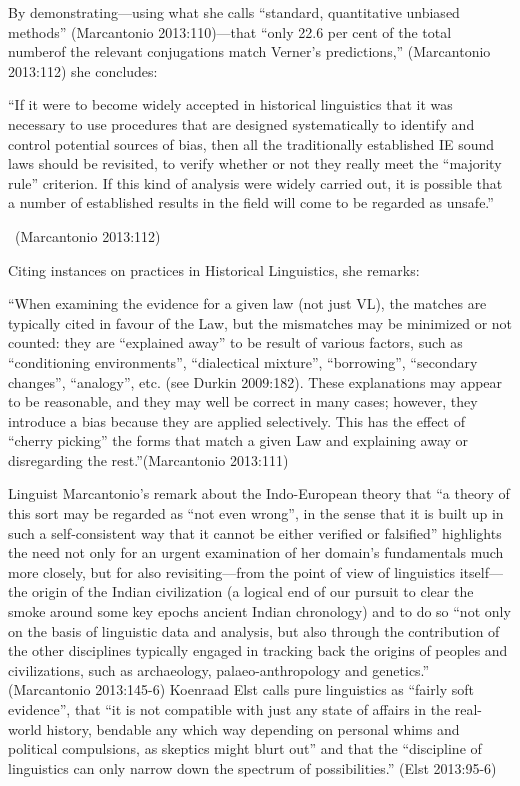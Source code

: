 By demonstrating—using what she calls “standard, quantitative unbiased methods” (Marcantonio 2013:110)—that “only 22.6 per cent of the total numberof the relevant conjugations match Verner’s predictions,” (Marcantonio 2013:112) she concludes:

\begin{myquote}
“If it were to become widely accepted in historical linguistics that it was necessary to use procedures that are designed systematically to identify and control potential sources of bias, then all the traditionally established IE sound laws should be revisited, to verify whether or not they really meet the “majority rule” criterion. If this kind of analysis were widely carried out, it is possible that a number of established results in the field will come to be regarded as unsafe.” 

~\hfill (Marcantonio 2013:112)
\end{myquote}

Citing instances on practices in Historical Linguistics, she remarks:

\begin{myquote}
“When examining the evidence for a given law (not just VL), the matches are typically cited in favour of the Law, but the mismatches may be minimized or not counted: they are “explained away” to be result of various factors, such as “conditioning environments”, “dialectical mixture”, “borrowing”, “secondary changes”, “analogy”, etc. (see Durkin 2009:182). These explanations may appear to be reasonable, and they may well be correct in many cases; however, they introduce a bias because they are applied selectively. This has the effect of “cherry picking” the forms that match a given Law and explaining away or disregarding the rest.”\hfill (Marcantonio 2013:111)
\end{myquote}

Linguist Marcantonio’s remark about the Indo-European theory that “a theory of this sort may be regarded as “not even wrong”, in the sense that it is built up in such a self-consistent way that it cannot be either verified or falsified” highlights the need not only for an urgent examination of her domain’s fundamentals much more closely, but for also revisiting—from the point of view of linguistics itself—the origin of the Indian civilization (a logical end of our pursuit to clear the smoke around some key epochs ancient Indian chronology) and to do so “not only on the basis of linguistic data and analysis, but also through the contribution of the other disciplines typically engaged in tracking back the origins of peoples and civilizations, such as archaeology, palaeo-anthropology and genetics.” (Marcantonio 2013:145-6) Koenraad Elst calls pure linguistics as “fairly soft evidence”, that “it is not compatible with just any state of affairs in the real-world history, bendable any which way depending on personal whims and political compulsions, as skeptics might blurt out” and that the “discipline of linguistics can only narrow down the spectrum of possibilities.” (Elst 2013:95-6)

